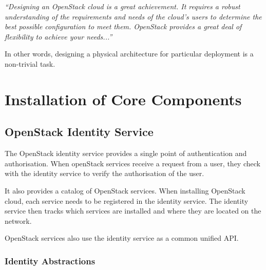 \textit{“Designing an OpenStack cloud is a great achievement. It requires a robust understanding of the requirements and needs of the cloud’s users to determine the best possible configuration to meet them. OpenStack provides a great deal of flexibility to achieve your needs...”} \cite{OperationsGuide}

In other words, designing a physical architecture for particular deployment is a non-trivial task.




\section{Installation of Core Components}




\subsection{OpenStack Identity Service}
The OpenStack identity service provides a single point of authentication and authorisation. When openStack services receive a request from a user, they check with the identity service to verify the authorisation of the user.

It also provides a catalog of OpenStack services. When installing OpenStack cloud, each service needs to be registered in the identity service. The identity service then tracks which services are installed and where they are located on the network.

OpenStack services also use the identity service as a common unified API.

\subsubsection*{Identity Abstractions}

